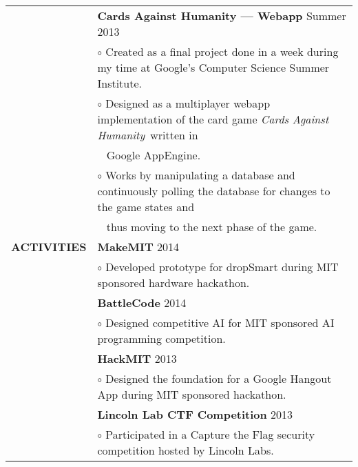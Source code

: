 \documentclass[11pt,letterpaper]{article}
\begin{document}
\begin{tabular}{@{}lp{6.6in}}
&\textbf{Cards Against Humanity --- Webapp} \hfill Summer 2013\\
&\hspace{10pt}$\circ$ Created as a final project done in a week during my time at Google's Computer Science Summer Institute.\\
&\hspace{10pt}$\circ$ Designed as  a multiplayer webapp implementation of the card game \emph{Cards Against Humanity}\ written in\\ &\ \hspace{3ex} Google AppEngine.\\
&\hspace{10pt}$\circ$ Works by manipulating a database and continuously polling the database for changes to the game states and\\
&\ \hspace{3ex} thus moving to the next phase of the game.\\

\textbf{ACTIVITIES}
&\textbf{MakeMIT} \hfill 2014\\
&\hspace{10pt}$\circ$ Developed prototype for dropSmart during MIT sponsored hardware hackathon. \\
&\textbf{BattleCode} \hfill 2014\\
&\hspace{10pt}$\circ$ Designed competitive AI for MIT sponsored AI programming competition. \\
&\textbf{HackMIT} \hfill 2013\\
&\hspace{10pt}$\circ$ Designed the foundation for a Google Hangout App during MIT sponsored hackathon.\\
&\textbf{Lincoln Lab CTF Competition} \hfill 2013\\
&\hspace{10pt}$\circ$ Participated in a Capture the Flag security competition hosted by Lincoln Labs.\\
\end{tabular}
\end{document}
